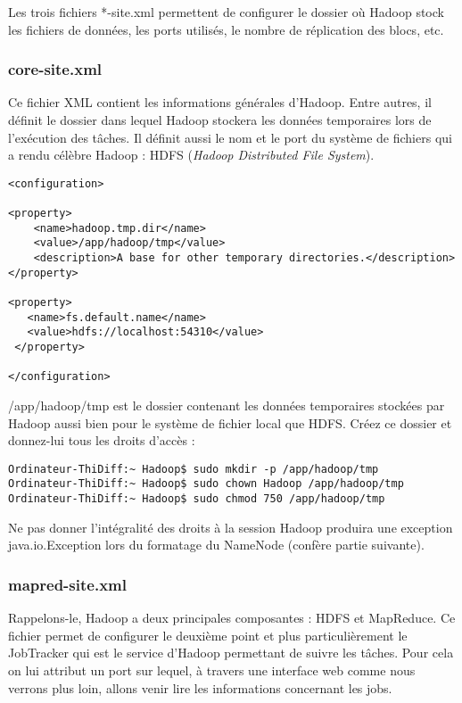 \par Les trois fichiers *-site.xml permettent de configurer le dossier où Hadoop stock les fichiers de données, les ports utilisés, le nombre de réplication des blocs, etc.

\subsubsection{core-site.xml}

\par Ce fichier XML contient les informations générales d'Hadoop. Entre autres, il définit le dossier dans lequel Hadoop stockera les données temporaires lors de l'exécution des tâches. Il définit aussi le nom et le port du système de fichiers qui a rendu célèbre Hadoop : HDFS (\textit{Hadoop Distributed File System}).

\begin{verbatim}
<configuration>

<property>
	<name>hadoop.tmp.dir</name>
	<value>/app/hadoop/tmp</value>
	<description>A base for other temporary directories.</description>
</property>

<property>
   <name>fs.default.name</name>
   <value>hdfs://localhost:54310</value>
 </property>

</configuration>
\end{verbatim}

\par /app/hadoop/tmp est le dossier contenant les données temporaires stockées par Hadoop aussi bien pour le système de fichier local que HDFS. Créez ce dossier et donnez-lui tous les droits d'accès :

\begin{verbatim}
Ordinateur-ThiDiff:~ Hadoop$ sudo mkdir -p /app/hadoop/tmp
Ordinateur-ThiDiff:~ Hadoop$ sudo chown Hadoop /app/hadoop/tmp
Ordinateur-ThiDiff:~ Hadoop$ sudo chmod 750 /app/hadoop/tmp
\end{verbatim}

\par Ne pas donner l'intégralité des droits à la session Hadoop produira une exception java.io.Exception lors du formatage du NameNode (confère partie suivante).

\subsubsection{mapred-site.xml}

\par Rappelons-le, Hadoop a deux principales composantes : HDFS et MapReduce. Ce fichier permet de configurer le deuxième point et plus particulièrement le JobTracker qui est le service d'Hadoop permettant de suivre les tâches. Pour cela on lui attribut un port sur lequel, à travers une interface web comme nous verrons plus loin, allons venir lire les informations concernant les jobs.

